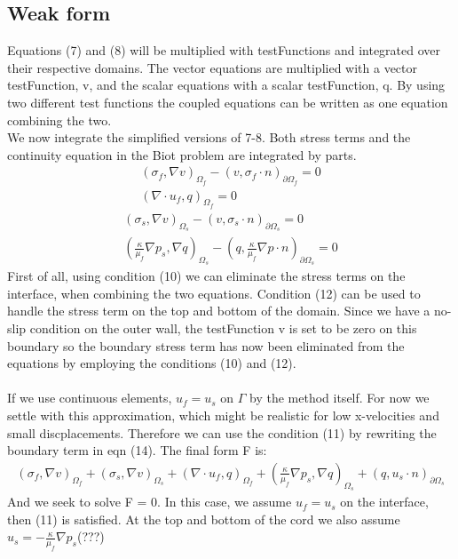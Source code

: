 \subsection{Weak form}
Equations (7) and (8) will be multiplied with testFunctions and integrated over their respective domains. The vector equations are multiplied with a vector testFunction, v, and the scalar equations with a scalar testFunction, q. By using two different test functions the coupled equations can be written as one equation combining the two. 
\\
We now integrate the simplified versions of 7-8. Both stress terms and the continuity equation in the Biot problem are integrated by parts. 
\begin{align} (\sigma_f, \nabla v)_{\Omega_f} 
	- (v,\sigma_f \cdot n)_{\partial \Omega_f} 
	= 0 \nonumber \\
	(\nabla \cdot u_f, q)_{\Omega_f} = 0
\end{align}
\begin{align} 
	 (\sigma_s, \nabla v)_{\Omega_s} 
	- (v,\sigma_s \cdot n)_{\partial \Omega_s} 
	= 0 \nonumber \\
	(\frac{\kappa}{\mu_f} \nabla p_s, \nabla q)_{\Omega_s}
	- (q,\frac{\kappa}{\mu_f}\nabla p \cdot n) _{\partial \Omega_s}
	= 0
\end{align}
First of all, using condition (10) we can eliminate the stress terms on the interface, when combining the two equations. Condition (12) can be used to handle the stress term on the top and bottom of the domain. Since we have a no-slip condition on the outer wall, the testFunction v is set to be zero on this boundary so the boundary stress term has now been eliminated from the equations by employing the conditions (10) and (12). 
\\
\\
If we use continuous elements, $u_f = u_s$ on $\Gamma$ by the method itself. For now we settle with this approximation, which might be realistic for low x-velocities and small discplacements. Therefore we can use the condition (11) by rewriting the boundary term in eqn (14). The final form F is:
\begin{align}
	 (\sigma_f, \nabla v)_{\Omega_f} 
	+ (\sigma_s, \nabla v)_{\Omega_s}
	+ (\nabla \cdot u_f, q)_{\Omega_f}
	+ (\frac{\kappa}{\mu_f} \nabla p_s, \nabla q)_{\Omega_s}
	+ (q, u_s \cdot n)_{\partial \Omega_s}
\end{align}
And we seek to solve F = 0. In this case, we assume $u_f = u_s$ on the interface, then (11) is satisfied. At the top and bottom of the cord we also assume $u_s = -\frac{\kappa}{\mu_f}\nabla p_s$(???) 
	
